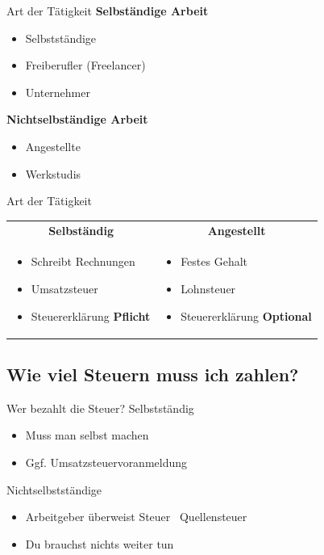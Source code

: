 \documentclass{beamer}
\begin{document}
			\begin{frame}{Art der Tätigkeit}
				\textbf{Selbständige Arbeit}
				\begin{itemize}
					\item Selbstständige
					\item Freiberufler (Freelancer)
					\item Unternehmer
				\end{itemize}
				\pause
				\textbf{Nichtselbständige Arbeit}
				\begin{itemize}
					\item Angestellte
					\item Werkstudis
				\end{itemize}
			\end{frame}
		
			\begin{frame}{Art der Tätigkeit}
				\begin{tabularx}{\linewidth}{X|X}
					\multicolumn{1}{c|}{\textbf{Selbständig}\citewiki{Selbständigkeit\_(beruflich)\#Steuerrecht}} &
					\multicolumn{1}{c}{\textbf{Angestellt}} \\[0.25cm]
					\begin{itemize}
						\item Schreibt Rechnungen
						\item Umsatzsteuer
						\item Steuererklärung \textbf{Pflicht}
					\end{itemize} &
					\begin{itemize}
						\item Festes Gehalt
						\item Lohnsteuer
						\item Steuererklärung \textbf{Optional}
					\end{itemize}
				\end{tabularx}
			\end{frame}
		
		\subsection{Wie viel Steuern muss ich zahlen?}
			
			\begin{frame}{Wer bezahlt die Steuer?}
				Selbstständig
				\begin{itemize}
					\item Muss man selbst machen
					\item Ggf. Umsatzsteuervoranmeldung
				\end{itemize}
				\pause
				Nichtselbstständige
				\begin{itemize}
					\item Arbeitgeber überweist Steuer \textrightarrow\ Quellensteuer
					\item Du brauchst nichts weiter tun
				\end{itemize}
			\end{frame}
			
\end{document}
